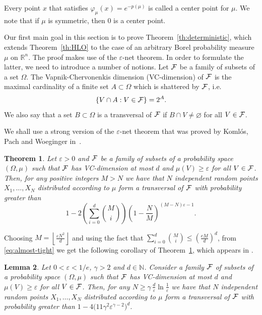 \documentclass[11pt,leqno]{article}
\newtheorem{theorem}{Theorem}[section]
\newtheorem{lemma}[theorem]{Lemma}
\theoremstyle{definition}
\theoremstyle{remark}
\numberwithin{equation}{section}
\newcommand{\ls}{\leqslant}
\newcommand{\gr}{\geqslant}
\newcommand{\1}{\textbf{1}}
\begin{document}
Every point $x$ that satisfies $\varphi_{\mu}(x)=e^{-p(\mu)}$ is called a center point for $\mu$. We note that if $\mu$ is symmetric, then $0$ is a center point.

\smallskip

Our first main goal in this section is to prove Theorem~\ref{th:deterministic}, which extends Theorem~\ref{th:HLO} to
the case of an arbitrary Borel probability measure $\mu$ on $\mathbb{R}^n$. The proof makes use of the $\varepsilon$-net theorem.
In order to formulate the latter, we need to introduce a number of notions. Let ${\cal F}$ be a family of subsets of a set $\Omega$.
The Vapnik-Chervonenkis dimension (VC-dimension) of ${\cal F}$ is the maximal cardinality of a finite set $A\subset \Omega$
which is shattered by ${\cal F}$, i.e.
$$\{V\cap A:V\in {\cal F}\}=2^A.$$
We also say that a set $B\subset \Omega$ is a transversal of ${\cal F}$ if $B\cap V\neq\varnothing $ for all $V\in {\cal F}$.

We shall use a strong version of the $\varepsilon$-net theorem that was proved by Koml\'{o}s, Pach and Woeginger in~\cite[Theorem~3.2]{Komlos-Pach-Woeginger}.

\begin{theorem}\label{th:epsilon-net}Let $\varepsilon>0$ and ${\cal F}$ be a family of subsets of a probability space $(\Omega,\mu )$ such that ${\cal F}$ has VC-dimension at most $d$ and $\mu (V)\gr\varepsilon $ for all $V\in {\cal F}$. Then, for any positive integers $M>N$
we have that $N$ independent random points $X_1,\ldots ,X_N$ distributed according to $\mu $ form a transversal of ${\cal F}$ with probability greater than
\begin{equation}\label{eq:almost-tight}1-2\left(\sum_{i=0}^d\binom{M}{i}\right)\left(1-\frac{N}{M}\right)^{(M-N)\varepsilon -1}.\end{equation}
\end{theorem}

Choosing $\displaystyle M=\left\lfloor \frac{\varepsilon N^2}{d}\right\rfloor$ and using the fact that
$\displaystyle \sum_{i=0}^d\binom{M}{i}\ls\left(\frac{eM}{d}\right)^d$, from \eqref{eq:almost-tight} we get the following
corollary of Theorem~\ref{th:epsilon-net}, which appears in \cite[Lemma~3.2]{Naszodi}.

\begin{lemma}\label{lem:naszodi}Let $0<\varepsilon <1/e$, $\gamma >2$ and $d\in {\mathbb N}$. Consider
a family ${\cal F}$ of subsets of a probability space $(\Omega,\mu )$ such that ${\cal F}$ has VC-dimension at most $d$ and $\mu (V)\gr\varepsilon $ for all $V\in {\cal F}$. Then, for any $N\gr\gamma\,\frac{d}{\varepsilon }\ln \frac{1}{\varepsilon }$
we have that $N$ independent random points $X_1,\ldots ,X_N$ distributed according to $\mu $ form a transversal of ${\cal F}$ with probability greater than $1-4\big(11\gamma^2\varepsilon^{\gamma -2}\big)^d$.
\end{lemma}
\end{document}
